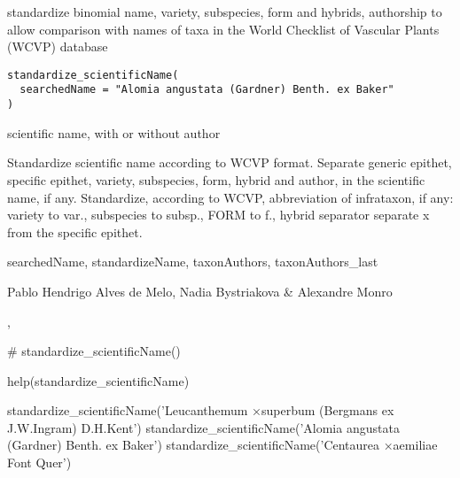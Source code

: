 \documentclass[a4paper]{book}
\begin{document}
%
\begin{Description}
standardize binomial name, variety, subspecies, form and hybrids, authorship
to allow comparison with names of taxa in the World Checklist of Vascular Plants (WCVP) database
\end{Description}
%
\begin{Usage}
\begin{verbatim}
standardize_scientificName(
  searchedName = "Alomia angustata (Gardner) Benth. ex Baker"
)
\end{verbatim}
\end{Usage}
%
\begin{Arguments}
\begin{ldescription}
\item[\code{searchedName}] scientific name, with or without author
\end{ldescription}
\end{Arguments}
%
\begin{Details}
Standardize scientific name according to WCVP format.
Separate generic epithet, specific epithet, variety, subspecies, form, hybrid and author, in the scientific name, if any.
Standardize, according to WCVP, abbreviation of infrataxon, if any:
variety to var.,
subspecies to subsp.,
FORM to f.,
hybrid separator separate x from the specific epithet.
\end{Details}
%
\begin{Value}
searchedName,
standardizeName,
taxonAuthors,
taxonAuthors\_last
\end{Value}
%
\begin{Author}
Pablo Hendrigo Alves de Melo,
Nadia Bystriakova \&
Alexandre Monro
\end{Author}
%
\begin{SeeAlso}
, 
\end{SeeAlso}
%
\begin{Examples}
\begin{ExampleCode}

# standardize_scientificName()

help(standardize_scientificName)

standardize_scientificName('Leucanthemum ×superbum (Bergmans ex J.W.Ingram) D.H.Kent')
standardize_scientificName('Alomia angustata (Gardner) Benth. ex Baker')
standardize_scientificName('Centaurea ×aemiliae Font Quer')


\end{ExampleCode}
\end{Examples}
\end{document}
